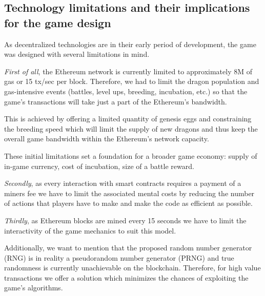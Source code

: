\documentclass[12pt]{article}
\begin{document}
\subsection{Technology limitations and their implications for the game design}
 \label{Technology limitations and their implications for the game design}   \par


As decentralized technologies are in their early period of development, the game was designed with several limitations in mind.\par

\textit{First of all}, the Ethereum network is currently limited to approximately 8M of gas or 15 tx/sec per block. Therefore, we had to limit the dragon population and gas-intensive events (battles, level ups, breeding, incubation, etc.) so that the game’s transactions will take just a part of the Ethereum’s bandwidth.\par

This is achieved by offering a limited quantity of genesis eggs and constraining the breeding speed which will limit the supply of new dragons and thus keep the overall game bandwidth within the Ethereum’s network capacity.\par

These initial limitations set a foundation for a broader game economy: supply of in-game currency, cost of incubation, size of a battle reward.\par

\textit{Secondly}, as every interaction with smart contracts requires a payment of a miners fee we have to limit the associated mental costs by reducing the number of actions that players have to make and make the code as efficient as possible.\par

\textit{Thirdly}, as Ethereum blocks are mined every 15 seconds we have to limit the interactivity of the game mechanics to suit this model.\par

Additionally, we want to mention that the proposed random number generator (RNG) is in reality a pseudorandom number generator (PRNG) and true randomness is currently unachievable on the blockchain. Therefore, for high value transactions we offer a solution which minimizes the chances of exploiting the game’s algorithms.\par
\end{document}
